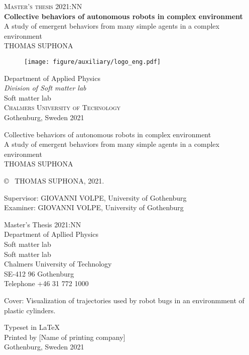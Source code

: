 \newpage
\thispagestyle{empty}
\begin{center}
	\textsc{\large Master's thesis 2021:NN}\\[4cm]		%
	\textbf{\Large Collective behaviors of autonomous robots in complex environment} \\[1cm]
	{\large A study of emergent behaviors from many simple agents in a complex environment}\\[1cm]
	{\large THOMAS SUPHONA}
	
	\vfill	
	\begin{figure}[H]
	\centering
	\texttt{[image: figure/auxiliary/logo\_eng.pdf]} \\	
	\end{figure}	\vspace{5mm}	
	
	Department of Applied Physics \\
	\emph{Division of Soft matter lab}\\
	Soft matter lab\\
	\textsc{Chalmers University of Technology} \\
	Gothenburg, Sweden 2021 \\
\end{center}


\newpage
\thispagestyle{plain}
\vspace*{4.5cm}
Collective behaviors of autonomous robots in complex environment\\
A study of emergent behaviors from many simple agents in a complex environment\\
THOMAS SUPHONA \setlength{\parskip}{1cm}

\copyright ~ THOMAS SUPHONA, 2021. \setlength{\parskip}{1cm}

Supervisor: GIOVANNI VOLPE, University of Gothenburg\\
Examiner: GIOVANNI VOLPE, University of Gothenburg \setlength{\parskip}{1cm}

Master's Thesis 2021:NN\\	%
Department of Apllied Physics\\
Soft matter lab\\
Soft matter lab\\
Chalmers University of Technology\\
SE-412 96 Gothenburg\\
Telephone +46 31 772 1000 \setlength{\parskip}{0.5cm}

\vfill
Cover: Visualization of trajectories used by robot bugs in an environmment of plastic cylinders.\setlength{\parskip}{0.5cm}

Typeset in \LaTeX \\
Printed by [Name of printing company]\\
Gothenburg, Sweden 2021

